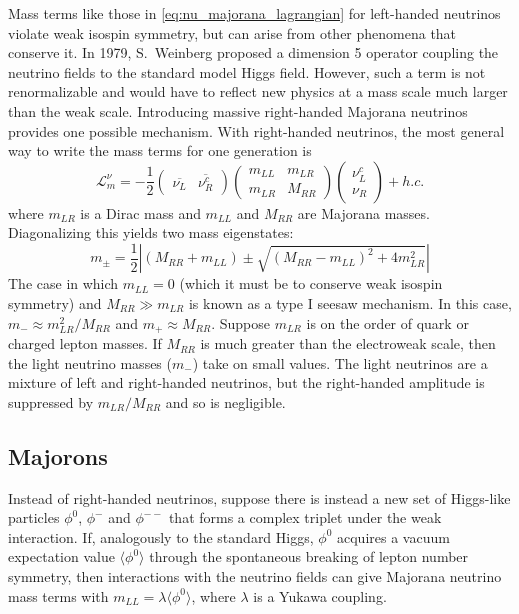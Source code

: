 \documentclass[herrin-thesis.tex]{subfiles}
\begin{document}
Mass terms like those in \cref{eq:nu_majorana_lagrangian} for left-handed neutrinos violate weak isospin symmetry, but can arise from other phenomena that conserve it. In 1979, S.~Weinberg \cite{Weinberg:1979qa} proposed a dimension 5 operator coupling the neutrino fields to the standard model Higgs field. However, such a term is not renormalizable and would have to reflect new physics at a mass scale much larger than the weak scale. Introducing massive right-handed Majorana neutrinos provides one possible mechanism. With right-handed neutrinos, the most general way to write the mass terms for one generation is
\begin{equation}
\mathcal{L}_{m}^{\nu} = -\frac{1}{2}
\begin{pmatrix}
	\overline{\nu_{L}} 	&	\overline{\nu_{R}^{c}}
\end{pmatrix}
\begin{pmatrix}
	m_{L L} 		&	m_{L R}			\\
	m_{L R}		&	M_{R R}
\end{pmatrix}
\begin{pmatrix}
	\nu_{L}^{c}	\\
	\nu_{R}
\end{pmatrix} + h.c.
\label{eq:nu_mass_matrix}
\end{equation}
where \(m_{L R}\) is a Dirac mass and \(m_{L L}\) and \(M_{R R}\) are Majorana masses. Diagonalizing this yields two mass eigenstates:
\begin{equation}
m_{\pm} = \frac{1}{2}\left | (M_{R R} + m_{L L}) \pm \sqrt{\left(M_{R R} - m_{L L}\right)^2 + 4 m_{L R}^2}\right |
\label{eq:nu_diagonalized_masses}
\end{equation}
The case in which \(m_{L L} = 0\) (which it must be to conserve weak isospin symmetry) and \(M_{R R}\gg m_{L R}\) is known as a type I seesaw mechanism. In this case, \(m_{-} \approx m_{L R}^2/M_{R R}\) and \(m_{+} \approx M_{R R}\). Suppose \(m_{L R}\) is on the order of quark or charged lepton masses. If \(M_{R R}\) is much greater than the electroweak scale, then the light neutrino masses (\(m_{-}\)) take on small values. The light neutrinos are a mixture of left and right-handed neutrinos, but the right-handed amplitude is suppressed by \(m_{L R}/M_{R R}\) and so is negligible.

\subsection{Majorons}
\label{sec:nu_majoron_theory}
Instead of right-handed neutrinos, suppose there is instead a new set of Higgs-like particles \(\phi^0\), \(\phi^{-}\) and \(\phi^{--}\) that forms a complex triplet under the weak interaction. If, analogously to the standard Higgs, \(\phi^0\) acquires a vacuum expectation value \(\langle\phi^0\rangle\) through the spontaneous breaking of lepton number symmetry, then interactions with the neutrino fields can give Majorana neutrino mass terms with \(m_{L L} = \lambda \langle\phi^0\rangle\), where \(\lambda\) is a Yukawa coupling.
\end{document}
